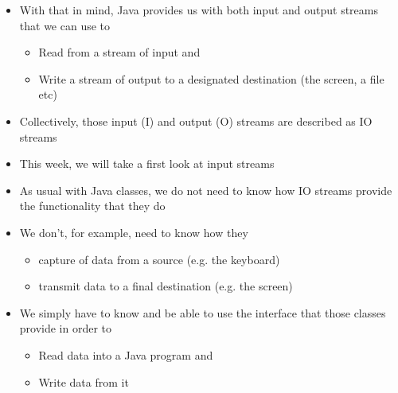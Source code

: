 \documentclass{beamer}
\begin{document}
\begin{frame}
\begin{itemize}
\item With that in mind, Java provides us with both input and output streams that we can use to
\begin{itemize}
\item Read from a stream of input and
\item Write a stream of output to a designated destination (the screen, a file etc)
\end{itemize}
\item Collectively, those input (I) and output (O) streams are described as IO streams
\item This week, we will take a first look at input streams
\end{itemize}

\end{frame}
\begin{frame}

\begin{itemize}
\item As usual with Java classes, we do not need to know how IO streams provide the functionality that they do 
\item We don't, for example, need to know how they

\begin{itemize}
\item capture of data from a source (e.g. the keyboard)
\item transmit data to a final destination (e.g. the screen)
\end{itemize}
\item We simply have to know and be able to use the interface that those classes provide in order to

\begin{itemize}
\item Read data into a Java program and
\item Write data from it
\end{itemize}
\end{itemize}

\end{frame}
\end{document}
